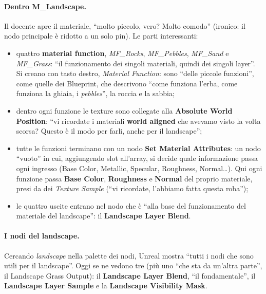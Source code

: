 \paragraph{Dentro M\_Landscape.} Il docente apre il materiale, ``molto piccolo, vero?
Molto comodo'' (ironico: il nodo principale è ridotto a un solo pin). Le parti interessanti:
\begin{itemize}
  \item quattro \textbf{material function}, \emph{MF\_Rocks}, \emph{MF\_Pebbles},
        \emph{MF\_Sand} e \emph{MF\_Grass}: ``il funzionamento dei singoli materiali, quindi
        dei singoli layer''. Si creano con tasto destro, \emph{Material Function}: sono
        ``delle piccole funzioni'', come quelle dei Blueprint, che descrivono ``come funziona
        l'erba, come funziona la ghiaia, i \emph{pebbles}'', la roccia e la sabbia;
  \item dentro ogni funzione le texture sono collegate alla \textbf{Absolute World
        Position}: ``vi ricordate i materiali \textbf{world aligned} che avevamo visto la
        volta scorsa? Questo è il modo per farli, anche per il landscape'';
  \item tutte le funzioni terminano con un nodo \textbf{Set Material Attributes}: un nodo
        ``vuoto'' in cui, aggiungendo slot all'array, si decide quale informazione passa ogni
        ingresso (Base Color, Metallic, Specular, Roughness, Normal\dots). Qui ogni funzione
        passa \textbf{Base Color}, \textbf{Roughness} e \textbf{Normal} del proprio materiale,
        presi da dei \emph{Texture Sample} (``vi ricordate, l'abbiamo fatta questa roba'');
  \item le quattro uscite entrano nel nodo che è ``alla base del funzionamento del
        materiale del landscape'': il \textbf{Landscape Layer Blend}.
\end{itemize}

\paragraph{I nodi del landscape.} Cercando \emph{landscape} nella palette dei nodi, Unreal
mostra ``tutti i nodi che sono utili per il landscape''. Oggi se ne vedono tre (più uno ``che
sta da un'altra parte'', il Landscape Grass Output): il \textbf{Landscape Layer Blend},
``il fondamentale'', il \textbf{Landscape Layer Sample} e la \textbf{Landscape Visibility
Mask}.

